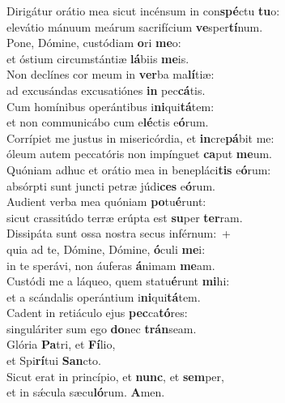 \evenverse Dirigátur orátio mea sicut incénsum in con\textbf{spé}ctu \textbf{tu}o:~\*\\
\evenverse elevátio mánuum meárum sacrifícium \textbf{ve}sper\textbf{tí}num.\\
\oddverse Pone, Dómine, custódiam \textbf{o}ri \textbf{me}o:~\*\\
\oddverse et óstium circumstántiæ \textbf{lá}biis \textbf{me}is.\\
\evenverse Non declínes cor meum in \textbf{ver}ba ma\textbf{lí}tiæ:~\*\\
\evenverse ad excusándas excusatiónes \textbf{in} pec\textbf{cá}tis.\\
\oddverse Cum homínibus operántibus i\textbf{ni}qui\textbf{tá}tem:~\*\\
\oddverse et non communicábo cum e\textbf{lé}ctis e\textbf{ó}rum.\\
\evenverse Corrípiet me justus in misericórdia, et \textbf{in}cre\textbf{pá}bit me:~\*\\
\evenverse óleum autem peccatóris non impínguet \textbf{ca}put \textbf{me}um.\\
\oddverse Quóniam adhuc et orátio mea in benepláci\textbf{tis} e\textbf{ó}rum:~\*\\
\oddverse absórpti sunt juncti petræ júdi\textbf{ces} e\textbf{ó}rum.\\
\evenverse Audient verba mea quóniam \textbf{po}tu\textbf{é}runt:~\*\\
\evenverse sicut crassitúdo terræ erúpta est \textbf{su}per \textbf{ter}ram.\\
\oddverse Dissipáta sunt ossa nostra secus inférnum:~+\\
\oddverse  quia ad te, Dómine, Dómine, \textbf{ó}culi \textbf{me}i:~\*\\
\oddverse in te sperávi, non áuferas \textbf{á}nimam \textbf{me}am.\\
\evenverse Custódi me a láqueo, quem statu\textbf{é}runt \textbf{mi}hi:~\*\\
\evenverse et a scándalis operántium i\textbf{ni}qui\textbf{tá}tem.\\
\oddverse Cadent in retiáculo ejus \textbf{pec}ca\textbf{tó}res:~\*\\
\oddverse singuláriter sum ego \textbf{do}nec \textbf{trán}seam.\\
\evenverse Glória \textbf{Pa}tri, et \textbf{Fí}lio,~\*\\
\evenverse et Spi\textbf{rí}tui \textbf{San}cto.\\
\oddverse Sicut erat in princípio, et \textbf{nunc}, et \textbf{sem}per,~\*\\
\oddverse et in sǽcula sæcu\textbf{ló}rum. \textbf{A}men.\\
